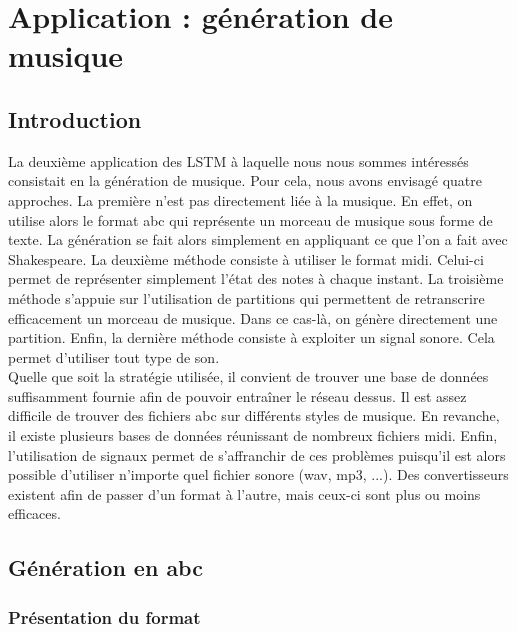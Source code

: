 \chapter{Application : génération de musique}

\section{Introduction}

La deuxième application des LSTM à laquelle nous nous sommes intéressés consistait en la génération de musique. Pour cela, nous avons envisagé quatre approches. La première n'est pas directement liée à la musique. En effet, on utilise alors le format abc qui représente un morceau de musique sous forme de texte. La génération se fait alors simplement en appliquant ce que l'on a fait avec Shakespeare. La deuxième méthode consiste à utiliser le format midi. Celui-ci permet de représenter simplement l'état des notes à chaque instant. La troisième méthode s'appuie sur l'utilisation de partitions qui permettent de retranscrire efficacement un morceau de musique. Dans ce cas-là, on génère directement une partition. Enfin, la dernière méthode consiste à exploiter un signal sonore. Cela permet d'utiliser tout type de son. \\
Quelle que soit la stratégie utilisée, il convient de trouver une base de données suffisamment fournie afin de pouvoir entraîner le réseau dessus. Il est assez difficile de trouver des fichiers abc sur différents styles de musique. En revanche, il existe plusieurs bases de données réunissant de nombreux fichiers midi. Enfin, l'utilisation de signaux permet de s'affranchir de ces problèmes puisqu'il est alors possible d'utiliser n'importe quel fichier sonore (wav, mp3, ...). Des convertisseurs existent afin de passer d'un format à l'autre, mais ceux-ci sont plus ou moins efficaces.

\section{Génération en abc}

\subsection{Présentation du format}

